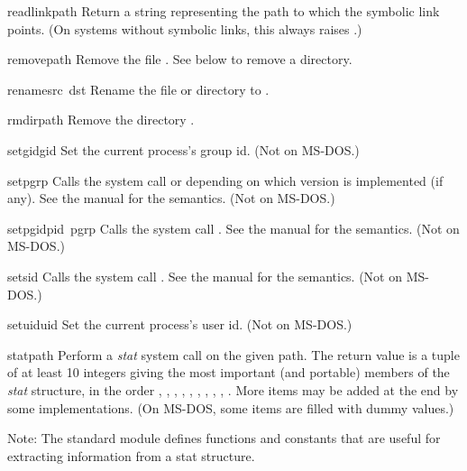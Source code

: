 \begin{funcdesc}{readlink}{path}
Return a string representing the path to which the symbolic link
points.  (On systems without symbolic links, this always raises
.)
\end{funcdesc}

\begin{funcdesc}{remove}{path}
Remove the file .  See  below to remove a directory.
\end{funcdesc}

\begin{funcdesc}{rename}{src\, dst}
Rename the file or directory  to .
\end{funcdesc}

\begin{funcdesc}{rmdir}{path}
Remove the directory .
\end{funcdesc}

\begin{funcdesc}{setgid}{gid}
Set the current process's group id.
(Not on MS-DOS.)
\end{funcdesc}

\begin{funcdesc}{setpgrp}{}
Calls the system call  or 
depending on which version is implemented (if any).  See the {\UNIX}
manual for the semantics.
(Not on MS-DOS.)
\end{funcdesc}

\begin{funcdesc}{setpgid}{pid\, pgrp}
Calls the system call .  See the {\UNIX} manual for
the semantics.
(Not on MS-DOS.)
\end{funcdesc}

\begin{funcdesc}{setsid}{}
Calls the system call .  See the {\UNIX} manual for the
semantics.
(Not on MS-DOS.)
\end{funcdesc}

\begin{funcdesc}{setuid}{uid}
Set the current process's user id.
(Not on MS-DOS.)
\end{funcdesc}

\begin{funcdesc}{stat}{path}
Perform a {\em stat} system call on the given path.  The return value
is a tuple of at least 10 integers giving the most important (and
portable) members of the {\em stat} structure, in the order
,
,
,
,
,
,
,
,
,
.
More items may be added at the end by some implementations.
(On MS-DOS, some items are filled with dummy values.)

Note: The standard module  defines functions and constants
that are useful for extracting information from a stat structure.
\end{funcdesc}

